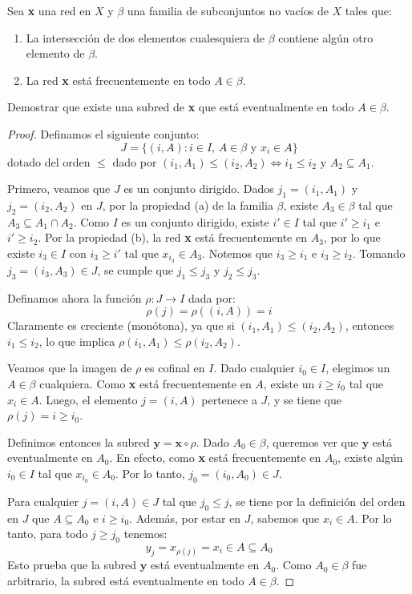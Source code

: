 \documentclass{article}
\theoremstyle{plain}
\theoremstyle{definition}
\newenvironment{ejercicio}[1]{\begin{trivlist}
\item[\hskip \labelsep {\bfseries Ejercicio}\hskip \labelsep {\bfseries #1.}]}{\end{trivlist}}
\begin{document}
\begin{ejercicio}{5}
    Sea \textbf{x} una red en \( X \) y \( \beta \) una familia de subconjuntos no vacíos de \( X \) tales que:
    \begin{enumerate}
        \item La intersección de dos elementos cualesquiera de \( \beta \) contiene algún otro elemento de \( \beta \).
        \item La red \textbf{x} está frecuentemente en todo \( A \in \beta \).
    \end{enumerate}
    Demostrar que existe una subred de \textbf{x} que está eventualmente en todo \( A \in \beta \).
\end{ejercicio}
\begin{proof}
    Definamos el siguiente conjunto:
    \[
        J = \{ (i, A) : i \in I, \, A \in \beta \text{ y } x_i \in A \}
    \]
    dotado del orden \( \leq \) dado por \((i_1, A_1) \leq (i_2, A_2) \iff i_1 \leq i_2 \text{ y } A_2 \subseteq A_1\).

    Primero, veamos que \(J\) es un conjunto dirigido. Dados \(j_1 = (i_1, A_1)\) y \(j_2 = (i_2, A_2)\) en \(J\),
    por la propiedad (a) de la familia \(\beta \), existe \(A_3 \in \beta \) tal que \(A_3 \subseteq A_1 \cap A_2\).
    Como \(I\) es un conjunto dirigido, existe \(i' \in I\) tal que \(i' \geq i_1\) e \(i' \geq i_2\).
    Por la propiedad (b), la red \textbf{x} está frecuentemente en \(A_3\), por lo que existe \(i_3 \in I\) con \(i_3 \geq i'\)
    tal que \(x_{i_3} \in A_3\). Notemos que \(i_3 \geq i_1\) e \(i_3 \geq i_2\).
    Tomando \(j_3 = (i_3, A_3) \in J\), se cumple que \(j_1 \leq j_3\) y \(j_2 \leq j_3\).

    Definamos ahora la función \(\rho: J \to I\) dada por:
    \[
        \rho(j) = \rho((i, A)) = i
    \]
    Claramente es creciente (monótona), ya que si \( (i_1, A_1) \leq (i_2, A_2) \), entonces \( i_1 \leq i_2 \), lo que implica \( \rho(i_1, A_1) \leq \rho(i_2, A_2) \).

    Veamos que la imagen de \(\rho \) es cofinal en \(I\). Dado cualquier \(i_0 \in I\), elegimos un \(A \in \beta \) cualquiera. Como \textbf{x} está frecuentemente en \(A\), existe un \(i \geq i_0\) tal que \(x_i \in A\). Luego, el elemento \(j = (i, A)\) pertenece a \(J\), y se tiene que \(\rho(j) = i \geq i_0\).

    Definimos entonces la subred \(\mathbf{y} = \mathbf{x} \circ \rho \).
    Dado \(A_0 \in \beta \), queremos ver que \(\mathbf{y}\) está eventualmente en \(A_0\). En efecto, como \textbf{x} está frecuentemente en \(A_0\), existe algún \(i_0 \in I\) tal que \(x_{i_0} \in A_0\). Por lo tanto, \(j_0 = (i_0, A_0) \in J\).

    Para cualquier \(j = (i, A) \in J\) tal que \(j_0 \leq j\), se tiene por la definición del orden en \(J\) que \(A \subseteq A_0\) e \(i \geq i_0\). Además, por estar en \(J\), sabemos que \(x_i \in A\). Por lo tanto, para todo \(j \geq j_0\) tenemos:
    \[
        y_j = x_{\rho(j)} = x_i \in A \subseteq A_0
    \]
    Esto prueba que la subred \(\mathbf{y}\) está eventualmente en \(A_0\). Como \(A_0 \in \beta \) fue arbitrario, la subred está eventualmente en todo \(A \in \beta \).
\end{proof}
\end{document}
